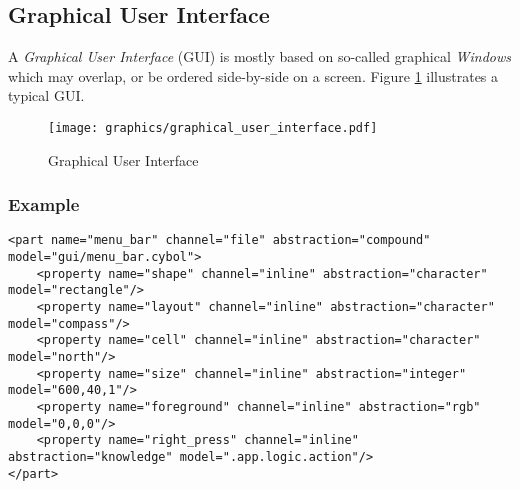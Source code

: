 %
%
%
%
%
%

\subsection{Graphical User Interface}
\label{graphical_user_interface_heading}

A \emph{Graphical User Interface} (GUI) is mostly based on so-called graphical
\emph{Windows} which may overlap, or be ordered side-by-side on a screen.
Figure \ref{graphical_user_interface_figure} illustrates a typical GUI.

\begin{figure}[ht]
    \begin{center}
        \texttt{[image: graphics/graphical\_user\_interface.pdf]}
        \caption{Graphical User Interface}
        \label{graphical_user_interface_figure}
    \end{center}
\end{figure}

\subsubsection{Example}

\begin{scriptsize}
    \begin{verbatim}
<part name="menu_bar" channel="file" abstraction="compound" model="gui/menu_bar.cybol">
    <property name="shape" channel="inline" abstraction="character" model="rectangle"/>
    <property name="layout" channel="inline" abstraction="character" model="compass"/>
    <property name="cell" channel="inline" abstraction="character" model="north"/>
    <property name="size" channel="inline" abstraction="integer" model="600,40,1"/>
    <property name="foreground" channel="inline" abstraction="rgb" model="0,0,0"/>
    <property name="right_press" channel="inline" abstraction="knowledge" model=".app.logic.action"/>
</part>
    \end{verbatim}
\end{scriptsize}

